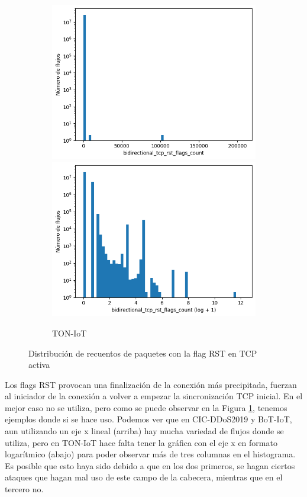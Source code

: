 \begin{figure}[H]
\begin{subfigure}[b]{0.32\textwidth}
        \includegraphics[width=\linewidth]{media/packet_pincer_toniot/bidirectional_tcp_rst_flags_count_linear_x_log_y.png}
        \includegraphics[width=\linewidth]{media/packet_pincer_toniot/bidirectional_tcp_rst_flags_count_log_x_log_y.png}
        \caption{TON-IoT}
    \end{subfigure}
    \hfill
       \caption{Distribución de recuentos de paquetes con la flag RST en TCP activa}
       \label{fig:packet_pincer_bidirectional_tcp_rst_flags_count}
\end{figure}

Los flags RST provocan una finalización de la conexión más precipitada, fuerzan al iniciador de la conexión a volver a empezar la sincronización TCP inicial. En el mejor caso no se utiliza, pero como se puede observar en la Figura \ref{fig:packet_pincer_bidirectional_tcp_rst_flags_count}, tenemos ejemplos donde si se hace uso. Podemos ver que en CIC-DDoS2019 y BoT-IoT, aun utilizando un eje x lineal (arriba) hay mucha variedad de flujos donde se utiliza, pero en TON-IoT hace falta tener la gráfica con el eje x en formato logarítmico (abajo) para poder observar más de tres columnas en el histograma. Es posible que esto haya sido debido a que en los dos primeros, se hagan ciertos ataques que hagan mal uso de este campo de la cabecera, mientras que en el tercero no.

